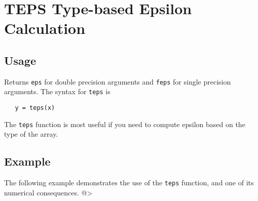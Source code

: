\section{TEPS Type-based Epsilon Calculation}

\subsection{Usage}

Returns \verb|eps| for double precision arguments and
\verb|feps| for single precision arguments.  The syntax for
\verb|teps| is
\begin{verbatim}
   y = teps(x)
\end{verbatim}
The \verb|teps| function is most useful if you need to
compute epsilon based on the type of the array.
\subsection{Example}

The following example demonstrates the use of the \verb|teps| function,
and one of its numerical consequences.
@>
